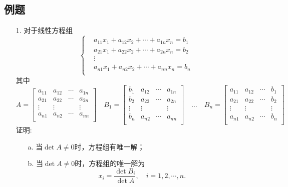 \subsection*{例题}
\begin{itemize}
	\item[1.] 对于线性方程组
	\begin{equation*}
	\left\{
	\begin{aligned}
	&a_{11} x_1 + a_{12} x_2 + \cdots + a_{1n}x_n = b_1\\
	&a_{21} x_1 + a_{22} x_2 + \cdots + a_{2n}x_n = b_2\\
	&\vdots\\
	&a_{n1} x_1 + a_{n2} x_2 + \cdots + a_{nn}x_n = b_n\\
	\end{aligned}
	\right.
	\end{equation*}
	其中
	\begin{equation*}
	A = \begin{bmatrix}
		a_{11} &a_{12} &\cdots & a_{1n}\\
		a_{21} &a_{22} &\cdots & a_{2n}\\
		\vdots & \vdots&       & \vdots\\
		a_{n1} &a_{n2} &\cdots & a_{nn}\\
	\end{bmatrix}
	\quad
	B_1 = 
	\begin{bmatrix}
		b_{1} &a_{12} &\cdots & a_{1n}\\
		b_{2} &a_{22} &\cdots & a_{2n}\\
		\vdots & \vdots&       & \vdots\\
		b_{n} &a_{n2} &\cdots & a_{nn}\\
	\end{bmatrix}
	\quad
	\dots
	\quad
	B_n = 
	\begin{bmatrix}
		a_{11} &a_{12} &\cdots & b_{1}\\
		a_{21} &a_{22} &\cdots & b_{2}\\
		\vdots & \vdots&       & \vdots\\
		a_{n1} &a_{n2} &\cdots & b_{n}\\
	\end{bmatrix}
	\end{equation*}
	证明:
	\begin{enumerate}
		\item[a.] 当$\det A \ne 0$时，方程组有唯一解；
		\item[b.] 当$\det A \ne 0$时，方程组的唯一解为
		$$x_i = \frac{\det B_i}{\det A}, \quad i= 1, 2, \cdots, n.$$
	\end{enumerate}
	\vspace{4cm}
\end{itemize}

